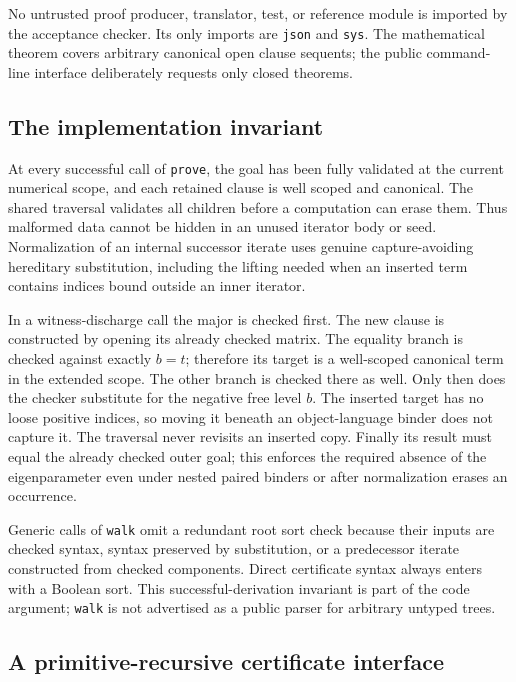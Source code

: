 \documentclass[11pt,letterpaper]{article}
\theoremstyle{definition}\newtheorem{definition}[theorem]{Definition}
\theoremstyle{remark}\newtheorem{remark}[theorem]{Remark}
\begin{document}
No untrusted proof producer, translator, test, or reference module is imported
by the acceptance checker. Its only imports are \texttt{json} and \texttt{sys}.
The mathematical theorem covers arbitrary canonical open clause sequents;
the public command-line interface deliberately requests only closed theorems.

\subsection{The implementation invariant}

At every successful call of \texttt{prove}, the goal has been fully validated
at the current numerical scope, and each retained clause is well scoped and
canonical. The shared traversal validates all children before a computation
can erase them. Thus malformed data cannot be hidden in an unused iterator
body or seed. Normalization of an internal successor iterate uses genuine
capture-avoiding hereditary substitution, including the lifting needed when
an inserted term contains indices bound outside an inner iterator.

In a witness-discharge call the major is checked first. The new clause is
constructed by opening its already checked matrix. The equality branch is
checked against exactly $b=t$; therefore its target is a well-scoped canonical
term in the extended scope. The other branch is checked there as well.
Only then does the checker substitute for the negative free level $b$.
The inserted target has no loose positive indices, so moving it beneath an
object-language binder does not capture it. The traversal never revisits an
inserted copy. Finally its result must equal the already checked outer goal;
this enforces the required absence of the eigenparameter even under nested
paired binders or after normalization erases an occurrence.

Generic calls of \texttt{walk} omit a redundant root sort check because their
inputs are checked syntax, syntax preserved by substitution, or a predecessor
iterate constructed from checked components. Direct certificate syntax always
enters with a Boolean sort. This successful-derivation invariant is part of
the code argument; \texttt{walk} is not advertised as a public parser for
arbitrary untyped trees.

\subsection{A primitive-recursive certificate interface}
\end{document}
